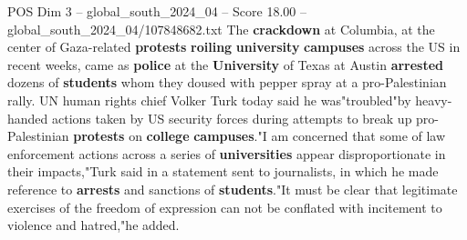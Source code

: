 \begin{textsample}{POS Dim 3 – global\_south\_2024\_04 – Score 18.00 – global\_south\_2024\_04/107848682.txt}
The \textbf{crackdown} at Columbia, at the center of Gaza-related \textbf{protests} \textbf{roiling} \textbf{university} \textbf{campuses} across the US in recent weeks, came as \textbf{police} at the \textbf{University} of Texas at Austin \textbf{arrested} dozens of \textbf{students} whom they doused with pepper spray at a pro-Palestinian rally.
UN human rights chief Volker Turk today said he was"troubled"by heavy-handed actions taken by US security forces during attempts to break up pro-Palestinian \textbf{protests} on \textbf{college} \textbf{campuses}."I am concerned that some of law enforcement actions across a series of \textbf{universities} appear disproportionate in their impacts,"Turk said in a statement sent to journalists, in which he made reference to \textbf{arrests} and sanctions of \textbf{students}."It must be clear that legitimate exercises of the freedom of expression can not be conflated with incitement to violence and hatred,"he added.

\end{textsample}
